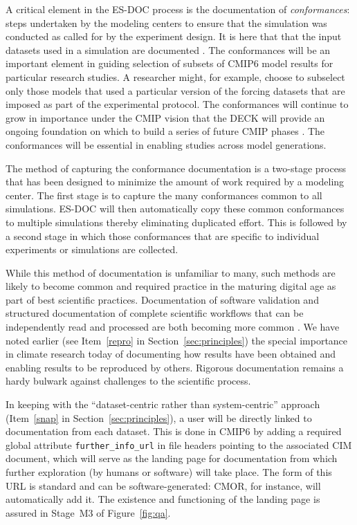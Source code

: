 \documentclass[gmd,manuscript]{copernicus}
\begin{document}
A critical element in the ES-DOC process is the documentation of
\emph{conformances}: steps undertaken by the modeling centers to
ensure that the simulation was conducted as called for by the
experiment design. It is here that that the input datasets used in a
simulation are documented \citep[e.g., the version of each of the
forcing datasets, see][]{ref:duracketal2018}. The conformances will be
an important element in guiding selection of subsets of CMIP6 model
results for particular research studies. A researcher might, for
example, choose to subselect only those models that used a particular
version of the forcing datasets that are imposed as part of the
experimental protocol. The conformances will continue to grow in
importance under the CMIP vision that the DECK will provide an ongoing
foundation on which to build a series of future CMIP phases
\citep[shown schematically in Figure~1 of][]{ref:eyringetal2016a}. The
conformances will be essential in enabling studies across model
generations.

The method of capturing the conformance documentation is a two-stage
process that has been designed to minimize the amount of work required
by a modeling center. The first stage is to capture the many
conformances common to all simulations. ES-DOC will then automatically
copy these common conformances to multiple simulations thereby
eliminating duplicated effort. This is followed by a second stage in
which those conformances that are specific to individual experiments
or simulations are collected.

While this method of documentation is unfamiliar to many, such methods
are likely to become common and required practice in the maturing
digital age as part of best scientific practices. Documentation of
software validation \citep[see e.g][]{ref:peng2011} and structured
documentation of complete scientific workflows that can be
independently read and processed are both becoming more common
\citep[see the special issue on the ``Geoscience Paper of the
Future'', ][]{ref:davidetal2016}. We have noted earlier
(see Item~\ref{repro} in Section~\ref{sec:principles}) the special
importance in climate research today of documenting how results have
been obtained and enabling results to be reproduced by others.
Rigorous documentation remains a hardy bulwark against challenges to
the scientific process.

In keeping with the ``dataset-centric rather than system-centric''
approach (Item~\ref{snap} in Section~\ref{sec:principles}), a user
will be directly linked to documentation from each dataset. This is
done in CMIP6 by
adding a required global attribute \texttt{further\_info\_url} in file
headers pointing to the associated CIM document, which will serve as
the landing page for documentation from which further exploration (by
humans or software) will take place. The form of this URL is standard
and can be software-generated: CMOR, for instance, will automatically
add it. The existence and functioning of the landing page is assured
in Stage~M3 of Figure~\ref{fig:qa}.
\end{document}

